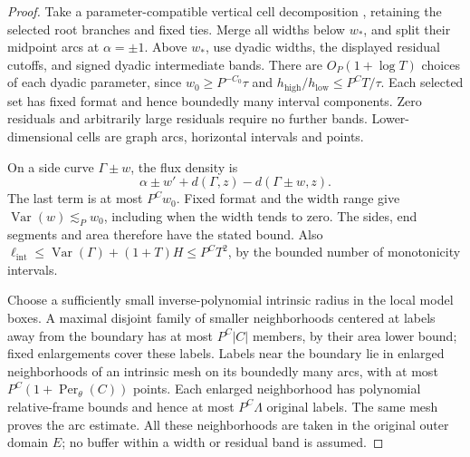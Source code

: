 \documentclass[11pt]{amsart}
\theoremstyle{definition}
\theoremstyle{remark}
\numberwithin{equation}{section}
\begin{document}
\begin{proof}
Take a parameter-compatible vertical cell decomposition \cite[Theorems 5.6 and 14.16]{BPR}, retaining the selected root branches and fixed ties. Merge all widths below \(w_*\), and split their midpoint arcs at \(\alpha=\pm1\). Above \(w_*\), use dyadic widths, the displayed residual cutoffs, and signed dyadic intermediate bands. There are \(O_P(1+\log T)\) choices of each dyadic parameter, since \(w_0\ge P^{-C_0}\tau\) and \(h_{\mathrm{high}}/h_{\mathrm{low}}\le P^CT/\tau\). Each selected set has fixed format and hence boundedly many interval components. Zero residuals and arbitrarily large residuals require no further bands. Lower-dimensional cells are graph arcs, horizontal intervals and points.

On a side curve \(\Gamma\pm w\), the flux density is
\[
\alpha\pm w'+d(\Gamma,z)-d(\Gamma\pm w,z).
\]
The last term is at most \(P^Cw_0\). Fixed format and the width range give \(\operatorname{Var}(w)\lesssim_Pw_0\), including when the width tends to zero. The sides, end segments and area therefore have the stated bound. Also \(\ell_{\mathrm{int}}\le\operatorname{Var}(\Gamma)+(1+T)H\le P^CT^2\), by the bounded number of monotonicity intervals.

Choose a sufficiently small inverse-polynomial intrinsic radius in the local model boxes. A maximal disjoint family of smaller neighborhoods centered at labels away from the boundary has at most \(P^C|C|\) members, by their area lower bound; fixed enlargements cover these labels. Labels near the boundary lie in enlarged neighborhoods of an intrinsic mesh on its boundedly many arcs, with at most \(P^C(1+\operatorname{Per}_{\theta}(C))\) points. Each enlarged neighborhood has polynomial relative-frame bounds and hence at most \(P^C\Lambda\) original labels. The same mesh proves the arc estimate. All these neighborhoods are taken in the original outer domain \(E\); no buffer within a width or residual band is assumed.
\end{proof}
\end{document}
